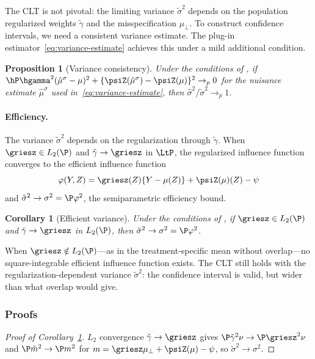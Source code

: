 \documentclass{article}
\newtheorem{corollary}[theorem]{Corollary}
\newtheorem{proposition}[theorem]{Proposition}
\begin{document}
The CLT is not pivotal:
the limiting variance $\tilde\sigma^2$
depends on the population regularized weights
$\tilde\gamma$ and the misspecification $\mu_\perp$.
To construct confidence intervals,
we need a consistent variance estimate.
The plug-in estimator~\eqref{eq:variance-estimate}
achieves this under a mild additional condition.

\begin{proposition}[Variance consistency]
\label{prop:variance-consistency}
Under the conditions of
,
if
$\hP\hgamma^2(\hat\mu^\sigma - \mu)^2
  + \{\psiZ(\hat\mu^\sigma) - \psiZ(\mu)\}^2
  \to_p 0$
for the nuisance estimate $\hat\mu^\sigma$
used in~\eqref{eq:variance-estimate},
then $\hat\sigma^2 / \tilde\sigma^2 \to_p 1$.
\end{proposition}

\paragraph{Efficiency.}
The variance $\tilde\sigma^2$
depends on the regularization
through $\tilde\gamma$.
When $\griesz \in L_2(\P)$
and $\tilde\gamma \to \griesz$ in $\LtP$,
the regularized influence function
converges to the efficient influence function
\begin{equation}\label{eq:influence-function}
\varphi(Y, Z)
  = \griesz(Z)\{Y - \mu(Z)\}
  + \psiZ(\mu)(Z) - \psi
\end{equation}
and $\tilde\sigma^2 \to \sigma^2 = \P\varphi^2$,
the semiparametric efficiency bound.

\begin{corollary}[Efficient variance]
\label{cor:efficient-variance}
Under the conditions of
,
if $\griesz \in L_2(\P)$
and $\tilde\gamma \to \griesz$ in $L_2(\P)$,
then $\tilde\sigma^2 \to \sigma^2 = \P\varphi^2$.
\end{corollary}

When $\griesz \notin L_2(\P)$---as
in the treatment-specific mean
without overlap---no square-integrable
efficient influence function exists.
The CLT still holds
with the regularization-dependent
variance $\tilde\sigma^2$:
the confidence interval is valid,
but wider than what overlap would give.

\subsubsection{Proofs}

\begin{proof}[Proof of Corollary~\ref{cor:efficient-variance}]
$L_2$ convergence
$\tilde\gamma \to \griesz$ gives
$\P\tilde\gamma^2\nu \to \P\griesz^2\nu$
and $\P\tilde m^2 \to \P m^2$
for $m = \griesz\mu_\perp + \psiZ(\mu) - \psi$,
so $\tilde\sigma^2 \to \sigma^2$.
\end{proof}
\end{document}
